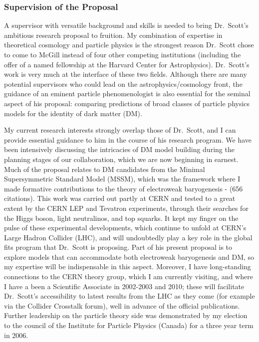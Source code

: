 \documentclass[12pt]{article}
\begin{document}
\parindent 0cm
\parskip 10pt
\baselineskip 12pt

\subsubsection*{Supervision of the Proposal}

A supervisor with versatile background and skills is needed to bring
Dr.\ Scott's ambitious research proposal to fruition.  My
combination of expertise in theoretical cosmology and particle
physics is the strongest reason Dr.\ Scott chose to come to McGill instead of
four other competing institutions (including the offer of a named
fellowship at the Harvard Center for Astrophysics).  Dr.\ Scott's work
is very much at the interface of these two fields.  Although there
are many potential supervisors who could lead on the
astrophysics/cosmology front, the guidance of an eminent particle
phenomenologist is also essential for the seminal aspect of his proposal:
comparing predictions of broad classes of particle physics models for 
the identity of dark matter (DM).

My current research interests strongly overlap those of Dr.\ Scott,
and I can provide essential guidance to him in the course of his
research program.  We have been intensively discussing the
intricacies of DM model building during the planning stages
of our collaboration, which we are now beginning in earnest.
Much of the proposal relates to DM candidates from the
Minimal Supersymmetric Standard Model (MSSM), which was the framework
where I made formative contributions to the theory of electroweak
baryogenesis \cite{Cline:1996cr}-\cite{Cline:2000nw} (656 citations). 
This work was carried out partly at CERN and tested to a great extent
by the CERN LEP and Tevatron experiments, through their searches for
the Higgs boson, light neutralinos, and top squarks.  It kept my finger on
the pulse of these experimental developments, which continue to unfold
at CERN's Large Hadron Collider (LHC), and will undoubtedly play
a key role in the global fits program that Dr.\ Scott is proposing. 
Part of his present proposal is to explore models that can
accommodate both electroweak baryogenesis and DM, so my
expertise will be indispensable in this aspect.   Moreover, I have
long-standing connections to the CERN theory group, which I am
currently visiting, and where I have a been a Scientific Associate
in 2002-2003 and 2010; these will facilitate Dr.\ Scott's accessibility
to latest results from the LHC as they come (for example via the
Collider Crosstalk forum), well in advance of the
official publications.  Further leadership on the particle theory side was
demonstrated by my election to the council of the 
Institute for Particle Physics (Canada) for a three year term in 2006.
\end{document}
